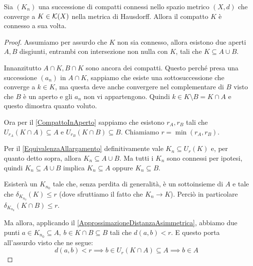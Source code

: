 \begin{theorem}
	Sia $(K_n)$ una successione di compatti connessi nello spazio metrico $(X,d)$ che converge a $K\in\mathcal{K}(X)$ nella metrica di Hausdorff. Allora il compatto $K$ è connesso a sua volta.
\end{theorem}
\begin{proof}
	Assumiamo per assurdo che $K$ non sia connesso, allora esistono due aperti $A,B$ disgiunti, entrambi con intersezione non nulla con $K$, tali che $K\subseteq A\cup B$.
	
	Innanzitutto $A\cap K, B\cap K$ sono ancora dei compatti. Questo perché presa una successione $(a_n)$ in $A\cap K$, sappiamo che esiste una sottosuccessione che converge a $k\in K$, ma questa deve anche convergere nel complementare di $B$ visto che $B$ è un aperto e gli $a_n$ non vi appartengono. Quindi $k\in K\setminus B = K\cap A$ e questo dimostra quanto voluto.
	
	Ora per il \cref{CompattoInAperto} sappiamo che esistono $r_A,r_B$ tali che $U_{r_A}(K\cap A)\subseteq A$ e $U_{r_B}(K\cap B)\subseteq B$. Chiamiamo $r=\min(r_A,r_B)$.

	Per il \cref{EquivalenzaAllargamento} definitivamente vale $K_n\subseteq U_r(K)$ e, per quanto detto sopra, allora $K_n\subseteq A\cup B$. 
	Ma tutti i $K_n$ sono connessi per ipotesi, quindi $K_n\subseteq A\cup B$ implica $K_n\subseteq A$ oppure $K_n\subseteq B$.

	Esisterà un $K_{n_0}$ tale che, senza perdita di generalità, è un sottoinsieme di $A$ e tale che $\delta_{K_{n_0}}(K)\le r$ (dove sfruttiamo il fatto che $K_n\to K$). Perciò in particolare $\delta_{K_{n_0}}(K\cap B)\le r$.

	Ma allora, applicando il \cref{ApprossimazioneDistanzaAsimmetrica}, abbiamo due punti $a\in K_{n_0}\subseteq A,\ b\in K\cap B\subseteq B$ tali che $d(a,b)<r$. E questo porta all'assurdo visto che ne segue:
	\begin{equation*}
		d(a,b)<r\implies b\in U_r(K\cap A) \subseteq A \implies b\in A
	\end{equation*}
	

	
\end{proof}



